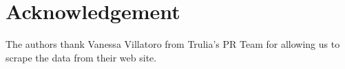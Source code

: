 \documentclass[12pt]{article}
\begin{document}
\section*{Acknowledgement}

The authors thank Vanessa Villatoro from Trulia's PR Team for allowing us to scrape the data from their web site.





\end{document}
